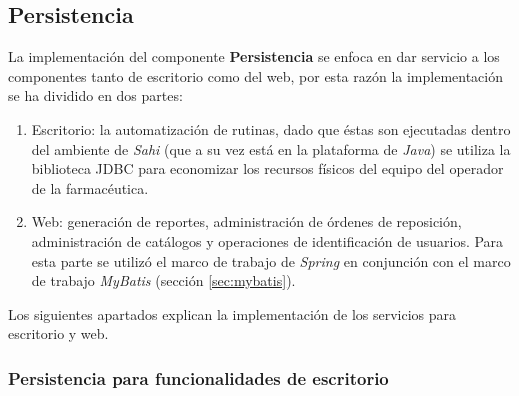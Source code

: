 \subsection{Persistencia}\label{sec:persistence}
La implementación del componente \textbf{Persistencia} se enfoca en dar servicio a los componentes tanto de escritorio como del web, por esta razón la implementación se ha dividido en dos partes:
\begin{enumerate}
 	\item Escritorio: la automatización de rutinas, dado que éstas son ejecutadas dentro del ambiente de \textit{Sahi} (que a su vez está en la plataforma de \textit{Java}) se utiliza la biblioteca JDBC para economizar los recursos físicos del equipo del operador de la farmacéutica.
 	\item Web: generación de reportes, administración de órdenes de reposición, administración de catálogos y operaciones de identificación  de usuarios. Para esta parte se utilizó el marco de trabajo de \textit{Spring} en conjunción con el marco de trabajo \textit{MyBatis} (sección \ref{sec:mybatis}).
\end{enumerate}
Los siguientes apartados explican la implementación de los servicios para escritorio y web.

\subsubsection{Persistencia para funcionalidades de escritorio}

